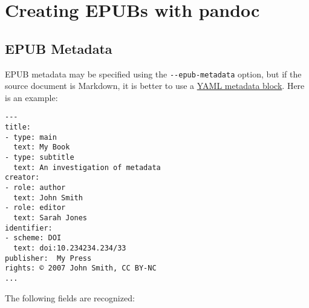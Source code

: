 \documentclass[]{article}
\begin{document}
\section{Creating EPUBs with pandoc}\label{creating-epubs-with-pandoc}

\hypertarget{epub-metadata}{\subsection{EPUB
Metadata}\label{epub-metadata}}

EPUB metadata may be specified using the \texttt{-\/-epub-metadata}
option, but if the source document is Markdown, it is better to use a
\protect\hyperlink{extension-yaml_metadata_block}{YAML metadata block}.
Here is an example:

\begin{verbatim}
---
title:
- type: main
  text: My Book
- type: subtitle
  text: An investigation of metadata
creator:
- role: author
  text: John Smith
- role: editor
  text: Sarah Jones
identifier:
- scheme: DOI
  text: doi:10.234234.234/33
publisher:  My Press
rights: © 2007 John Smith, CC BY-NC
...
\end{verbatim}

The following fields are recognized:
\end{document}
